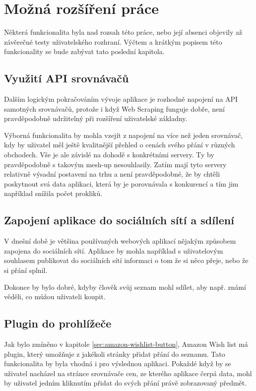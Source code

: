 \chapter{Možná rozšíření práce}
Některá funkcionalita byla nad rozsah této práce, nebo její absenci objevily až závěrečné testy uživatelského rozhraní. Výčtem a krátkým popisem této funkcionality se bude zabývat tato poslední kapitola.

\section{Využití API srovnávačů}
Dalším logickým pokračováním vývoje aplikace je rozhodně napojení na API samotných srovnávačů, protože i když Web Scraping funguje dobře, není pravděpodobně udržitelný při rozšíření uživatelské základny.

Výborná funkcionalita by mohla vzejít z napojení na více než jeden srovnávač, kdy by uživatel měl ještě kvalitnější přehled o cenách svého přání v různých obchodech. Vše je ale závislé na dohodě s konkrétními servery. Ty by pravděpodobně s takovým mesh-up nesouhlasily. Zatím mají tyto servery relativně výsadní postavení na trhu a není pravděpodobné, že by chtěli poskytnout svá data aplikaci, která by je porovnávala s konkurencí a tím jim například snížila počet prokliků.

\section{Zapojení aplikace do sociálních sítí a sdílení}
V dnešní době je většina používaných webových aplikací nějakým způsobem zapojena do sociálních sítí. Aplikace by mohla například s uživatelovým souhlasem publikovat do sociálních sítí informaci o tom že si něco přeje, nebo že si přání splnil.

Dokonce by bylo dobré, kdyby člověk svůj seznam mohl sdílet, aby např. známí věděli, co můžou uživateli koupit.

\section{Plugin do prohlížeče}
Jak bylo zmíněno v kapitole \ref{sec:amazon-wishlist-button}, Amazon Wish list má plugin, který umožňuje z jakékoli stránky přidat přání do seznamu. Tato funkcionalita by byla vhodná i pro výslednou aplikaci. Pokaždé když by se uživatel nacházel na stránce srovnávače cen, ze kterého aplikace čerpá data, mohl by uživatel jedním kliknutím přidat do svých přání právě zobrazovaný předmět.

